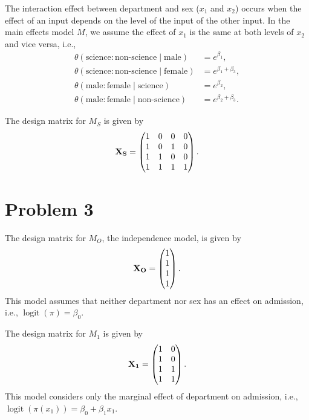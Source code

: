\documentclass[
  11pt,
]{article}
\begin{document}
The interaction effect between department and sex (\(x_1\) and \(x_2\))
occurs when the effect of an input depends on the level of the input of
the other input. In the main effects model \(M\), we assume the effect
of \(x_1\) is the same at both levels of \(x_2\) and vice versa, i.e.,
\begin{align*}
  \theta(\text{science}:\text{non-science} \;|\; \text{male})    &= e^{\beta_1},\\
  \theta(\text{science}:\text{non-science} \; | \;\text{female}) &= e^{\beta_1+\beta_3},\\
  \theta(\text{male}:\text{female} \;|\; \text{science})         &= e^{\beta_2},\\
  \theta(\text{male}:\text{female} \; | \; \text{non-science})   &= e^{\beta_2+\beta_3}.
\end{align*}

The design matrix for \(M_S\) is given by \[
\mathbf{X_S} = 
\begin{pmatrix}
  1 & 0 & 0 & 0\\
  1 & 0 & 1 & 0\\
  1 & 1 & 0 & 0\\
  1 & 1 & 1 & 1
\end{pmatrix}.
\]

\hypertarget{problem-3}{%
\section{Problem 3}\label{problem-3}}


The design matrix for \(M_O\), the independence model, is given by \[
\mathbf{X_O} = 
\begin{pmatrix}
  1\\
  1\\
  1\\
  1
\end{pmatrix}.
\] This model assumes that neither department nor sex has an effect on
admission, i.e., \(\operatorname{logit}(\pi) = \beta_0\).

The design matrix for \(M_1\) is given by \[
\mathbf{X_1} = 
\begin{pmatrix}
  1 & 0\\
  1 & 0\\
  1 & 1\\
  1 & 1
\end{pmatrix}.
\] This model considers only the marginal effect of department on
admission, i.e.,
\(\operatorname{logit}(\pi(x_1)) = \beta_0 + \beta_1 x_1\).
\end{document}
